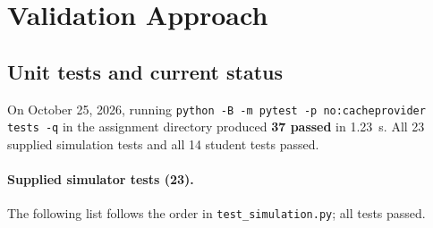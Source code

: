 \documentclass[11pt]{article}
\begin{document}
\section{Validation Approach}
\subsection{Unit tests and current status}\label{sec:tests}
On October 25, 2026, running \texttt{python -B -m pytest -p no:cacheprovider tests -q} in the assignment directory produced \textbf{37 passed} in 1.23~s. All 23 supplied simulation tests and all 14 student tests passed.
\paragraph{Supplied simulator tests (23).}
The following list follows the order in \texttt{test\_simulation.py}; all tests passed.
\end{document}
